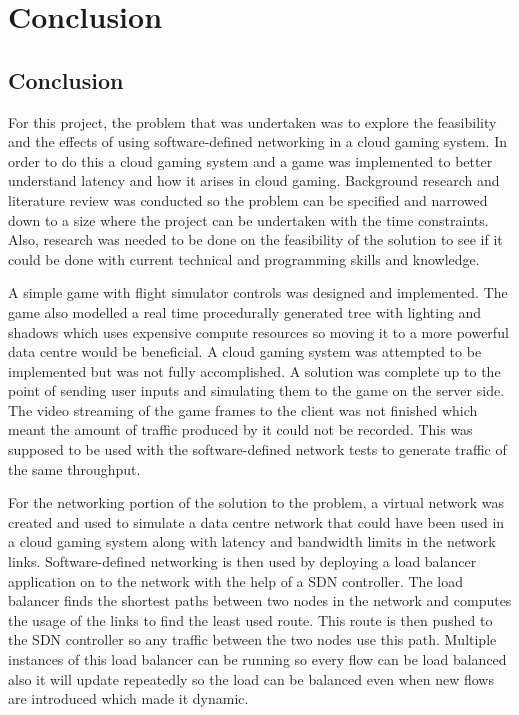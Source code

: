 \chapter{Conclusion}
\label{chapter6}

\section{Conclusion}
For this project, the problem that was undertaken was to explore the feasibility and the effects of using software-defined networking in a cloud gaming system. In order to do this a cloud gaming system and a game was implemented to better understand latency and how it arises in cloud gaming. Background research and literature review was conducted so the problem can be specified and narrowed down to a size where the project can be undertaken with the time constraints. Also, research was needed to be done on the feasibility of the solution to see if it could be done with current technical and programming skills and knowledge.
\newline
\par
A simple game with flight simulator controls was designed and implemented. The game also modelled a real time procedurally generated tree with lighting and shadows which uses expensive compute resources so moving it to a more powerful data centre would be beneficial. A cloud gaming system was attempted to be implemented but was not fully accomplished. A solution was complete up to the point of sending user inputs and simulating them to the game on the server side. The video streaming of the game frames to the client was not finished which meant the amount of traffic produced by it could not be recorded. This was supposed to be used with the software-defined network tests to generate traffic of the same throughput.
\newline
\par
For the networking portion of the solution to the problem, a virtual network was created and used to simulate a data centre network that could have been used in a cloud gaming system along with latency and bandwidth limits in the network links. Software-defined networking is then used by deploying a load balancer application on to the network with the help of a SDN controller. The load balancer finds the shortest paths between two nodes in the network and computes the usage of the links to find the least used route. This route is then pushed to the SDN controller so any traffic between the two nodes use this path. Multiple instances of this load balancer can be running so every flow can be load balanced also it will update repeatedly so the load can be balanced even when new flows are introduced which made it dynamic.
